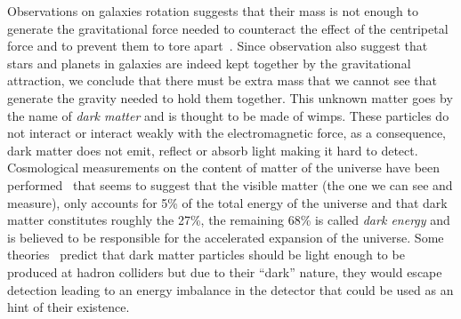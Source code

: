Observations on galaxies rotation suggests that their mass is not enough to
generate the gravitational force needed to counteract the effect of the
centripetal force and to prevent them to tore apart~\cite{RotationCurves}. Since
observation also suggest that stars and planets in galaxies are indeed kept
together by the gravitational attraction, we conclude that there must be extra
mass that we cannot see that generate the gravity needed to hold them
together. This unknown matter goes by the name of \emph{dark matter} and is
thought to be made of \glspl{wimp}. These particles do not interact or interact
weakly with the electromagnetic force, as a consequence, dark matter does not
emit, reflect or absorb light making it hard to detect. Cosmological
measurements on the content of matter of the universe have been
performed~\cite{DMEvidence} that seems to suggest that the visible matter (the
one we can see and measure), only accounts for 5\% of the total energy of the
universe and that dark matter constitutes roughly the 27\%, the remaining 68\%
is called \emph{dark energy} and is believed to be responsible for the
accelerated expansion of the universe. Some theories~\cite{WIMPIntro} predict
that dark matter particles should be light enough to be produced at hadron
colliders but due to their ``dark'' nature, they would escape detection leading
to an energy imbalance in the detector that could be used as an hint of their
existence.
